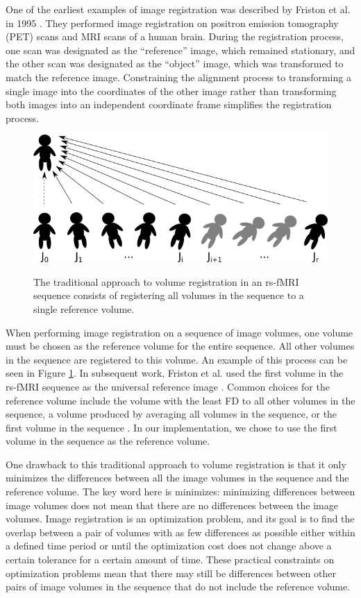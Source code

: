 One of the earliest examples of image registration was described by Friston et al. in 1995 \cite{Friston1995}. They performed image registration on positron emission tomography (PET) scans and MRI scans of a human brain. During the registration process, one scan was designated as the ``reference'' image, which remained stationary, and the other scan was designated as the ``object'' image, which was transformed to match the reference image. Constraining the alignment process to transforming a single image into the coordinates of the other image rather than transforming both images into an independent coordinate frame simplifies the registration process.

\begin{figure}
\centering
\includegraphics[width=.7\textwidth]{4/traditional-registration.png}
\label{fig:ch4:traditional-reg}
\caption{The traditional approach to volume registration in an rs-fMRI sequence consists of registering all volumes in the sequence to a single reference volume.}
\end{figure}

When performing image registration on a sequence of image volumes, one volume must be chosen as the reference volume for the entire sequence. All other volumes in the sequence are registered to this volume. An example of this process can be seen in Figure \ref{fig:ch4:traditional-reg}. In subsequent work, Friston et al. used the first volume in the rs-fMRI sequence as the universal reference image \cite{Friston1996}. Common choices for the reference volume include the volume with the least FD to all other volumes in the sequence, a volume produced by averaging all volumes in the sequence, or the first volume in the sequence \cite{Friston1996} \cite{Liao2005}. In our implementation, we chose to use the first volume in the sequence as the reference volume.

One drawback to this traditional approach to volume registration is that it only minimizes the differences between all the image volumes in the sequence and the reference volume. The key word here is minimizes: minimizing differences between image volumes does not mean that there are no differences between the image volumes. Image registration is an optimization problem, and its goal is to find the overlap between a pair of volumes with as few differences as possible either within a defined time period or until the optimization cost does not change above a certain tolerance for a certain amount of time. These practical constraints on optimization problems mean that there may still be differences between other pairs of image volumes in the sequence that do not include the reference volume. 

